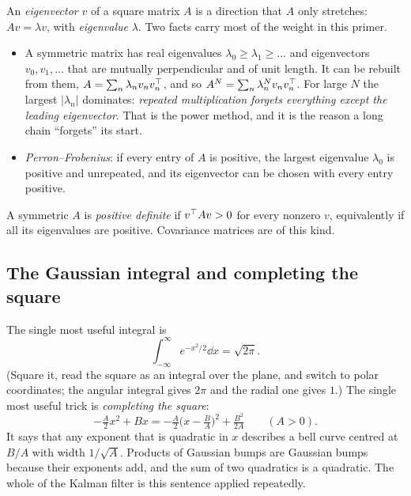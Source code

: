 An \emph{eigenvector} $v$ of a square matrix $A$ is a direction that $A$ only stretches: $Av=\lambda v$, with
\emph{eigenvalue} $\lambda$. Two facts carry most of the weight in this primer.
\begin{itemize}
\item A symmetric matrix has real eigenvalues $\lambda_0\ge\lambda_1\ge\dots$ and eigenvectors $v_0,v_1,\dots$ that
  are mutually perpendicular and of unit length. It can be rebuilt from them, $A=\sum_n\lambda_nv_nv_n^{\top}$, and so
  $A^N=\sum_n\lambda_n^Nv_nv_n^{\top}$. For large $N$ the largest $|\lambda_n|$ dominates: \emph{repeated multiplication
  forgets everything except the leading eigenvector}. That is the power method, and it is the reason a long
  chain ``forgets'' its start.
\item \emph{Perron--Frobenius}: if every entry of $A$ is positive, the largest eigenvalue $\lambda_0$ is positive
  and unrepeated, and its eigenvector can be chosen with every entry positive.
\end{itemize}
A symmetric $A$ is \emph{positive definite} if $v^{\top} Av>0$ for every nonzero $v$, equivalently if all its
eigenvalues are positive. Covariance matrices are of this kind.

\subsection{The Gaussian integral and completing the square}

The single most useful integral is
\begin{equation}\label{eq:gaussint}
  \int_{-\infty}^{\infty}e^{-x^2/2}\dd x=\sqrt{2\pi}.
\end{equation}
(Square it, read the square as an integral over the plane, and switch to polar coordinates; the angular
integral gives $2\pi$ and the radial one gives $1$.) The single most useful trick is \emph{completing the
square}:
\begin{equation}\label{eq:complete}
  -\tfrac{A}{2}x^2+Bx=-\tfrac{A}{2}\Big(x-\tfrac{B}{A}\Big)^2+\tfrac{B^2}{2A}\qquad(A>0).
\end{equation}
It says that any exponent that is quadratic in $x$ describes a bell curve centred at $B/A$ with width
$1/\sqrt A$. Products of Gaussian bumps are Gaussian bumps because their exponents add, and the sum of two
quadratics is a quadratic. The whole of the Kalman filter is this sentence applied repeatedly.


